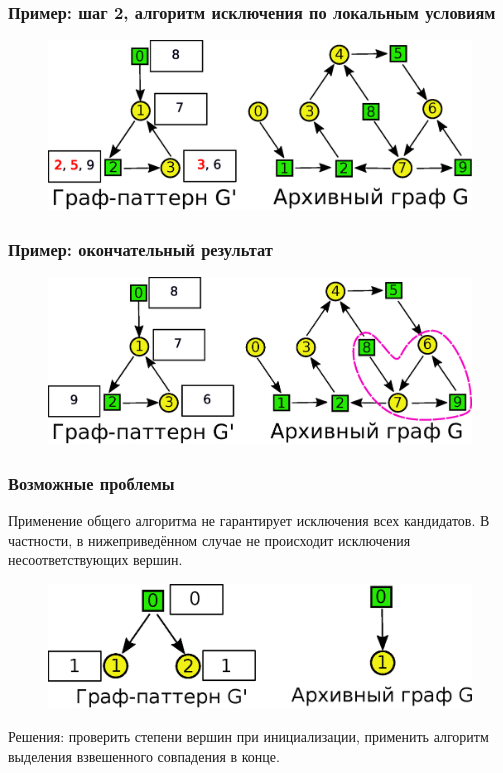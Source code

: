 \documentclass{beamer}
\begin{document}
\begin{frame}
\frametitle{Пример: шаг 2, алгоритм исключения по локальным условиям}
\begin{figure}[H]
	\centering
	\includegraphics[width=1\textwidth]{ee5}
	\label{fig:ee5}
\end{figure}
\end{frame}

\begin{frame}
\frametitle{Пример: окончательный результат}
\begin{figure}[H]
	\centering
	\includegraphics[width=1\textwidth]{ee7}
	\label{fig:ee7}
\end{figure}
\end{frame}

\begin{frame}
\frametitle{Возможные проблемы}
Применение общего алгоритма не гарантирует исключения всех кандидатов. В частности, в нижеприведённом случае не происходит исключения несоответствующих вершин.

\begin{figure}[H]
	\centering
	\includegraphics[width=1\textwidth]{problem}
	\label{fig:problem}
\end{figure}

Решения: проверить степени вершин при инициализации, применить алгоритм выделения взвешенного совпадения в конце.
\end{frame}
\end{document}
